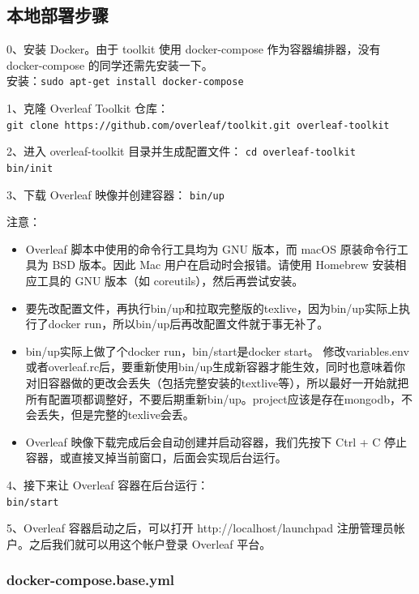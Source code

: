 \subsection{本地部署步骤}
0、安装 Docker。由于 toolkit 使用 docker-compose 作为容器编排器，没有 docker-compose 的同学还需先安装一下。\\
安装：\verb|sudo apt-get install docker-compose|

1、克隆 Overleaf Toolkit 仓库：\\
\verb|git clone https://github.com/overleaf/toolkit.git overleaf-toolkit|

2、进入 overleaf-toolkit 目录并生成配置文件：
\verb|cd overleaf-toolkit|\\
\verb|bin/init|

3、下载 Overleaf 映像并创建容器：
\verb|bin/up|

注意：
\begin{itemize}
\item Overleaf 脚本中使用的命令行工具均为 GNU 版本，而 macOS 原装命令行工具为 BSD 版本。因此 Mac 用户在启动时会报错。请使用 Homebrew 安装相应工具的 GNU 版本（如 coreutils），然后再尝试安装。

\item 要先改配置文件，再执行bin/up和拉取完整版的texlive，因为bin/up实际上执行了docker run，所以bin/up后再改配置文件就于事无补了。

\item bin/up实际上做了个docker run，bin/start是docker start。
修改variables.env或者overleaf.rc后，要重新使用bin/up生成新容器才能生效，同时也意味着你对旧容器做的更改会丢失（包括完整安装的textlive等），所以最好一开始就把所有配置项都调整好，不要后期重新bin/up。project应该是存在mongodb，不会丢失，但是完整的texlive会丢。

\item Overleaf 映像下载完成后会自动创建并启动容器，我们先按下 Ctrl + C 停止容器，或直接叉掉当前窗口，后面会实现后台运行。
\end{itemize}



4、接下来让 Overleaf 容器在后台运行：\\
\verb|bin/start|

5、Overleaf 容器启动之后，可以打开 http://localhost/launchpad 注册管理员帐户。之后我们就可以用这个帐户登录 Overleaf 平台。



\subsubsection{docker-compose.base.yml}

